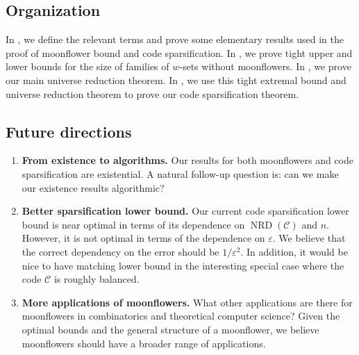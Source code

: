 \documentclass{article}
\DeclareMathOperator{\NRD}{NRD}
\newcommand{\<}{\langle}
\renewcommand{\>}{\rangle}
\newcommand{\calC}{\mathcal{C}}
\begin{document}
\subsection{Organization}
In , we define the relevant terms and prove some elementary results used in the proof of moonflower bound and code sparsification. In , we prove tight upper and lower bounds for the size of families of $w$-sets without moonflowers. In , we prove our main universe reduction theorem. In , we use this tight extremal bound and universe reduction theorem to prove our code sparsification theorem.

\subsection{Future directions}
\begin{enumerate}[(1)]
    \item  \textbf{From existence to algorithms.} Our results for both moonflowers and code sparsification are existential. A natural follow-up question is: can we make our existence results algorithmic?  
    \item \textbf{Better sparsification lower bound.} Our current code sparsification lower bound is near optimal in terms of its dependence on $\NRD (\calC)$ and $n$. However, it is not optimal in terms of the dependence on $\varepsilon$. We believe that the correct dependency on the error should be $1/\varepsilon^2$. In addition, it would be nice to have matching lower bound in the interesting special case where the code $\calC$ is roughly balanced.
    \item \textbf{More applications of moonflowers.} What other applications are there for moonflowers in combinatorics and theoretical computer science? Given the optimal bounds and the general structure of a moonflower, we believe moonflowers should have a broader range of applications. 
\end{enumerate}
\end{document}
